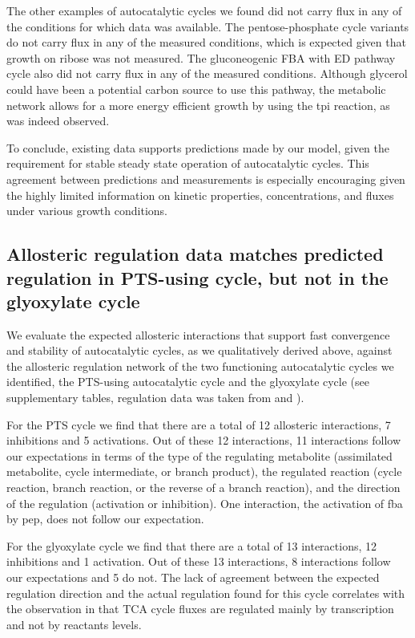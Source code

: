     The other examples of autocatalytic cycles we found did not carry flux in any of the conditions for which data was available.
    The pentose-phosphate cycle variants do not carry flux in any of the measured conditions, which is expected given that growth on ribose was not measured.
    The gluconeogenic FBA with ED pathway cycle also did not carry flux in any of the measured conditions.
    Although glycerol could have been a potential carbon source to use this pathway, the metabolic network allows for a more energy efficient growth by using the tpi reaction, as was indeed observed.

    To conclude, existing data supports predictions made by our model, given the requirement for stable steady state operation of autocatalytic cycles.
    This agreement between predictions and measurements is especially encouraging given the highly limited information on kinetic properties, concentrations, and fluxes under various growth conditions.

    \subsection{Allosteric regulation data matches predicted regulation in PTS-using cycle, but not in the glyoxylate cycle}
    We evaluate the expected allosteric interactions that support fast convergence and stability of autocatalytic cycles, as we qualitatively derived above, against the allosteric regulation network of the two functioning autocatalytic cycles we identified, the PTS-using autocatalytic cycle and the glyoxylate cycle (see supplementary tables, regulation data was taken from \cite{Keseler2013-xn} and \cite{Schomburg2004-st}).

    For the PTS cycle we find that there are a total of 12 allosteric interactions, 7 inhibitions and 5 activations.
    Out of these 12 interactions, 11 interactions follow our expectations in terms of the type of the regulating metabolite (assimilated metabolite, cycle intermediate, or branch product), the regulated reaction (cycle reaction, branch reaction, or the reverse of a branch reaction), and the direction of the regulation (activation or inhibition).
    One interaction, the activation of fba by pep, does not follow our expectation.

    For the glyoxylate cycle we find that there are a total of 13 interactions, 12 inhibitions and 1 activation.
    Out of these 13 interactions, 8 interactions follow our expectations and 5 do not.
    The lack of agreement between the expected regulation direction and the actual regulation found for this cycle correlates with the observation in \cite{Gerosa2015-oq} that TCA cycle fluxes are regulated mainly by transcription and not by reactants levels.
 
